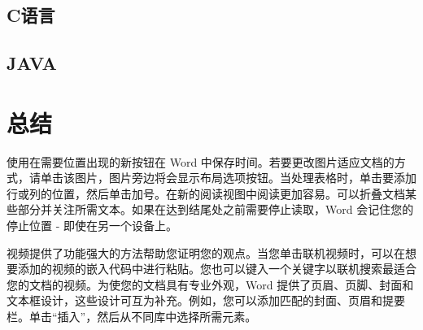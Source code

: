 \subsection{C语言}

\subsection{JAVA}




\newpage
\section{总结}
使用在需要位置出现的新按钮在 Word 中保存时间。若要更改图片适应文档的方式，请单击该图片，图片旁边将会显示布局选项按钮。当处理表格时，单击要添加行或列的位置，然后单击加号。在新的阅读视图中阅读更加容易。可以折叠文档某些部分并关注所需文本。如果在达到结尾处之前需要停止读取，Word 会记住您的停止位置 - 即使在另一个设备上。
\par 视频提供了功能强大的方法帮助您证明您的观点。当您单击联机视频时，可以在想要添加的视频的嵌入代码中进行粘贴。您也可以键入一个关键字以联机搜索最适合您的文档的视频。为使您的文档具有专业外观，Word 提供了页眉、页脚、封面和文本框设计，这些设计可互为补充。例如，您可以添加匹配的封面、页眉和提要栏。单击“插入”，然后从不同库中选择所需元素。
